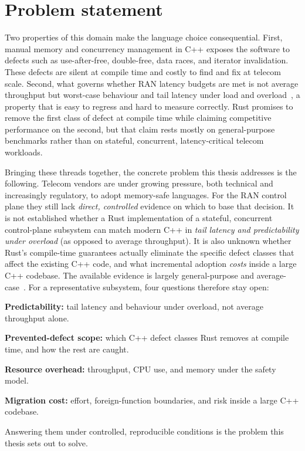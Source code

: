 \documentclass[english,oneside,a4paper,censored,csm,software-track-2020]{HYthesisML}
\begin{document}
\section{Problem statement}
Two properties of this domain make the language choice consequential. First, manual memory and
concurrency management in C++ exposes the software to defects such as use-after-free,
double-free, data races, and iterator invalidation. These defects are silent at compile time and
costly to find and fix at telecom scale. Second, what governs whether RAN latency budgets are met is not
average throughput but worst-case behaviour and tail latency under load and
overload~\cite{dean2013tail}, a property that is easy to regress and hard to measure correctly.
Rust promises to remove the first class of defect at compile time while claiming competitive
performance on the second, but that claim rests mostly on general-purpose benchmarks rather
than on stateful, concurrent, latency-critical telecom workloads.

Bringing these threads together, the concrete problem this thesis addresses is the following.
Telecom vendors are under growing pressure, both technical and increasingly regulatory, to adopt
memory-safe languages. For the RAN control plane they still lack \emph{direct, controlled}
evidence on which to base that decision. It is not established whether a Rust implementation of
a stateful, concurrent control-plane subsystem can match modern C++ in \emph{tail latency and
predictability under overload} (as opposed to average throughput). It is also unknown whether
Rust's compile-time guarantees actually eliminate the specific defect classes that affect the
existing C++ code, and what incremental adoption \emph{costs} inside a large C++ codebase. The
available evidence is largely general-purpose and
average-case~\cite{balasubramanian2017rust,qin2020rust}. For a representative subsystem,
four questions therefore stay open:
\begin{compactitem}
\item \textbf{Predictability:} tail latency and behaviour under overload, not average
throughput alone.
\item \textbf{Prevented-defect scope:} which C++ defect classes Rust removes at compile time,
and how the rest are caught.
\item \textbf{Resource overhead:} throughput, CPU use, and memory under the safety model.
\item \textbf{Migration cost:} effort, foreign-function boundaries, and risk inside a large
C++ codebase.
\end{compactitem}
Answering them under controlled, reproducible conditions is the problem this thesis sets out
to solve.
\end{document}
